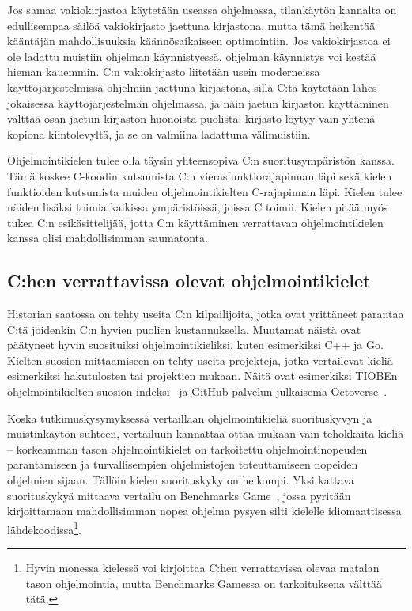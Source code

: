 Jos samaa vakiokirjastoa käytetään useassa ohjelmassa, tilankäytön kannalta on
edullisempaa säilöä vakiokirjasto jaettuna kirjastona, mutta tämä heikentää
kääntäjän mahdollisuuksia käännösaikaiseen optimointiin. Jos vakiokirjastoa ei
ole ladattu muistiin ohjelman käynnistyessä, ohjelman käynnistys voi kestää
hieman kauemmin. C:n vakiokirjasto liitetään usein moderneissa
käyttöjärjestelmissä ohjelmiin jaettuna kirjastona, sillä C:tä käytetään lähes
jokaisessa käyttöjärjestelmän ohjelmassa, ja näin jaetun kirjaston käyttäminen
välttää osan jaetun kirjaston huonoista puolista: kirjasto löytyy vain yhtenä
kopiona kiintolevyltä, ja se on valmiina ladattuna välimuistiin.

Ohjelmointikielen tulee olla täysin yhteensopiva C:n suoritusympäristön kanssa.
Tämä koskee C-koodin kutsumista C:n vierasfunktiorajapinnan
läpi sekä kielen funktioiden kutsumista
muiden ohjelmointikielten C-rajapinnan läpi. Kielen tulee näiden lisäksi toimia
kaikissa ympäristöissä, joissa C toimii. Kielen pitää myös tukea C:n
esikäsittelijää, jotta C:n käyttäminen verrattavan ohjelmointikielen kanssa
olisi mahdollisimman saumatonta.

\subsection{C:hen verrattavissa olevat ohjelmointikielet}

Historian saatossa on tehty useita C:n kilpailijoita, jotka ovat yrittäneet
parantaa C:tä joidenkin C:n hyvien puolien kustannuksella. Muutamat näistä ovat
päätyneet hyvin suosituiksi ohjelmointikieliksi, kuten esimerkiksi C++ ja Go.
Kielten suosion mittaamiseen on tehty useita projekteja, jotka vertailevat
kieliä esimerkiksi hakutulosten tai projektien mukaan. Näitä ovat esimerkiksi
TIOBEn ohjelmointikielten suosion indeksi~\citep{tiobe} ja GitHub-palvelun
julkaisema \mbox{Octoverse}~\citep{octoverse}.

Koska tutkimuskysymyksessä vertaillaan ohjelmointikieliä suorituskyvyn ja
muistinkäytön suhteen, vertailuun kannattaa ottaa mukaan vain tehokkaita kieliä
-- korkeamman tason ohjelmointikielet on tarkoitettu ohjelmointinopeuden
parantamiseen ja turvallisempien ohjelmistojen toteuttamiseen nopeiden
ohjelmien sijaan. Tällöin kielen suorituskyky on heikompi. Yksi kattava
suorituskykyä mittaava vertailu on Benchmarks Game~\citep{benchmarks}, jossa
pyritään kirjoittamaan mahdollisimman nopea ohjelma pysyen silti kielelle
idiomaattisessa lähdekoodissa\footnote{Hyvin monessa kielessä voi kirjoittaa
C:hen verrattavissa olevaa matalan tason ohjelmointia, mutta Benchmarks Gamessa
on tarkoituksena välttää tätä.}.


